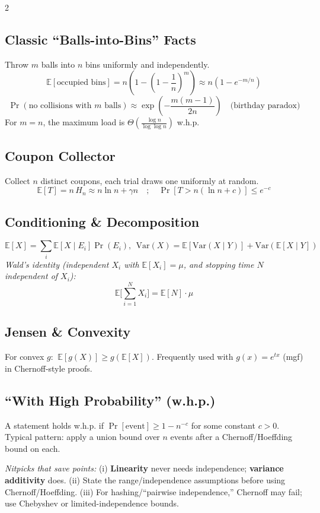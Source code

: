 \documentclass[10pt]{article}
\theoremstyle{definition}
\begin{document}
\begin{multicols*}{2}
\subsection{Classic “Balls-into-Bins” Facts}
Throw $m$ balls into $n$ bins uniformly and independently.
\[
\mathbb{E}[\text{occupied bins}] = n\left(1-\left(1-\frac{1}{n}\right)^{\!m}\right)\approx n\left(1-e^{-m/n}\right)
\]
\[
\Pr(\text{no collisions with }m\text{ balls})\approx \exp\!\left(-\frac{m(m-1)}{2n}\right)\quad\text{(birthday paradox)}
\]
For $m=n$, the maximum load is $\Theta\!\left(\frac{\log n}{\log\log n}\right)$ w.h.p.

\subsection{Coupon Collector}
Collect $n$ distinct coupons, each trial draws one uniformly at random.
\[
\mathbb{E}[T]=n\,H_n\approx n\ln n+\gamma n\quad;\quad \Pr\!\left[T>n(\ln n+c)\right]\le e^{-c}
\]

\subsection{Conditioning \& Decomposition}
\[
\mathbb{E}[X]=\sum_{i} \mathbb{E}[X\mid E_i]\Pr(E_i),\ \ \mathrm{Var}(X)=\mathbb{E}[\mathrm{Var}(X\mid Y)]+\mathrm{Var}(\mathbb{E}[X\mid Y])
\]
\emph{Wald’s identity (independent $X_i$ with $\mathbb{E}[X_i]=\mu$, and stopping time $N$ independent of $X_i$): }
\[
\mathbb{E}\Big[\sum_{i=1}^N X_i\Big]=\mathbb{E}[N]\cdot \mu
\]

\subsection{Jensen \& Convexity}
For convex $g$: $\ \mathbb{E}[g(X)]\ge g(\mathbb{E}[X])$. Frequently used with $g(x)=e^{tx}$ (mgf) in Chernoff-style proofs.

\subsection{“With High Probability” (w.h.p.)}
A statement holds w.h.p. if $\Pr[\text{event}]\ge 1 - n^{-c}$ for some constant $c>0$. Typical pattern: apply a union bound over $n$ events after a Chernoff/Hoeffding bound on each.

\smallskip
\noindent\textit{Nitpicks that save points:}
(i) \textbf{Linearity} never needs independence; \textbf{variance additivity} does. 
(ii) State the range/independence assumptions before using Chernoff/Hoeffding. 
(iii) For hashing/“pairwise independence,” Chernoff may fail; use Chebyshev or limited-independence bounds.




\end{multicols*}
\end{document}
